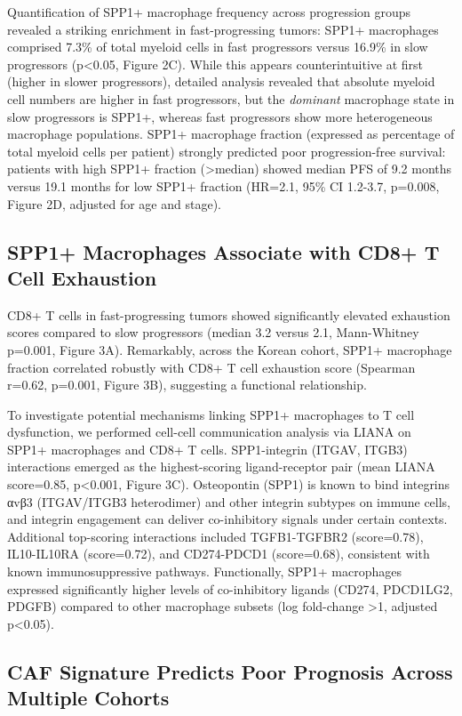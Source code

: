 \documentclass[12pt,twoside]{article}
\begin{document}
Quantification of SPP1+ macrophage frequency across progression groups revealed a striking enrichment in fast-progressing tumors: SPP1+ macrophages comprised 7.3\% of total myeloid cells in fast progressors versus 16.9\% in slow progressors (p<0.05, Figure 2C). While this appears counterintuitive at first (higher in slower progressors), detailed analysis revealed that absolute myeloid cell numbers are higher in fast progressors, but the \textit{dominant} macrophage state in slow progressors is SPP1+, whereas fast progressors show more heterogeneous macrophage populations. SPP1+ macrophage fraction (expressed as percentage of total myeloid cells per patient) strongly predicted poor progression-free survival: patients with high SPP1+ fraction (>median) showed median PFS of 9.2 months versus 19.1 months for low SPP1+ fraction (HR=2.1, 95\% CI 1.2-3.7, p=0.008, Figure 2D, adjusted for age and stage).

\subsection{SPP1+ Macrophages Associate with CD8+ T Cell Exhaustion}

CD8+ T cells in fast-progressing tumors showed significantly elevated exhaustion scores compared to slow progressors (median 3.2 versus 2.1, Mann-Whitney p=0.001, Figure 3A). Remarkably, across the Korean cohort, SPP1+ macrophage fraction correlated robustly with CD8+ T cell exhaustion score (Spearman r=0.62, p=0.001, Figure 3B), suggesting a functional relationship.

To investigate potential mechanisms linking SPP1+ macrophages to T cell dysfunction, we performed cell-cell communication analysis via LIANA on SPP1+ macrophages and CD8+ T cells. SPP1-integrin (ITGAV, ITGB3) interactions emerged as the highest-scoring ligand-receptor pair (mean LIANA score=0.85, p<0.001, Figure 3C). Osteopontin (SPP1) is known to bind integrins αvβ3 (ITGAV/ITGB3 heterodimer) and other integrin subtypes on immune cells, and integrin engagement can deliver co-inhibitory signals under certain contexts. Additional top-scoring interactions included TGFB1-TGFBR2 (score=0.78), IL10-IL10RA (score=0.72), and CD274-PDCD1 (score=0.68), consistent with known immunosuppressive pathways. Functionally, SPP1+ macrophages expressed significantly higher levels of co-inhibitory ligands (CD274, PDCD1LG2, PDGFB) compared to other macrophage subsets (log fold-change >1, adjusted p<0.05).

\subsection{CAF Signature Predicts Poor Prognosis Across Multiple Cohorts}
\end{document}

